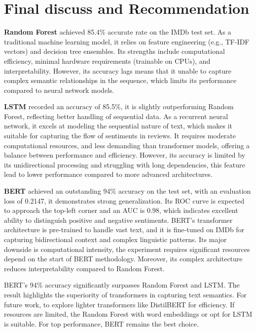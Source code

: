\section{Final discuss and Recommendation}

\textbf{Random Forest} achieved 85.4\% accurate rate on the IMDb test set. As a traditional machine learning model, it relies on feature engineering (e.g., TF-IDF vectors) and decision tree ensembles. Its strengths include computational efficiency, minimal hardware requirements (trainable on CPUs), and interpretability. However, its accuracy lags means that it unable to capture complex semantic relationships in the sequence, which limits its performance compared to neural network models.

\textbf{LSTM} recorded an accuracy of 85.5\%, it is slightly outperforming Random Forest, reflecting better handling of sequential data. As a recurrent neural network, it excels at modeling the sequential nature of text, which makes it suitable for capturing the flow of sentiments in reviews. It requires moderate computational resources, and less demanding than transformer models, offering a balance between performance and efficiency. However, its accuracy is limited by its unidirectional processing and struggling with long dependencies, this feature lead to lower performance compared to more advanced architectures.

\textbf{BERT} achieved an outstanding 94\% accuracy on the test set, with an evaluation loss of 0.2147, it demonstrates strong generalization. Its ROC curve is expected to approach the top-left corner and an AUC is 0.98, which indicates excellent ability to distinguish positive and negative sentiments. BERT's transformer architecture is pre-trained to handle vast text, and it is fine-tuned on IMDb for capturing bidirectional context and complex linguistic patterns. Its major downside is computational intensity, the experiment requires significant resources depend on the start of BERT methodology. Moreover, its complex architecture reduces interpretability compared to Random Forest.

BERT's 94\% accuracy significantly surpasses Random Forest and LSTM. The result highlights the superiority of transformers in capturing text semantics. For future work, to explore lighter transformers like DistilBERT for efficiency. If resources are limited, the Random Forest with word embeddings or opt for LSTM is suitable. For top performance, BERT remains the best choice.